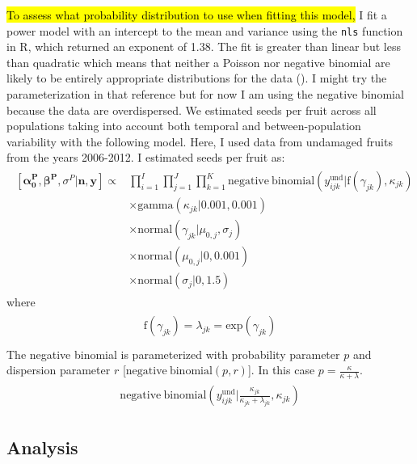 \documentclass[12pt, oneside, titlepage]{article}   	%
\begin{document}
\hl{To assess what probability distribution to use when fitting this model,} I fit a power model with an intercept to the mean and variance using the \verb|nls| function in R, which returned an exponent of 1.38. The fit is greater than linear but less than quadratic which means that neither a Poisson nor negative binomial are likely to be entirely appropriate distributions for the data (\cite{linden2011}). I might try the parameterization in that reference but for now I am using the negative binomial because the data are overdispersed. We estimated seeds per fruit across all populations taking into account both temporal and between-population variability with the following model. Here, I used data from undamaged fruits from the years 2006-2012. I estimated seeds per fruit as:
%
\begin{align}
  \begin{split}
 [ \bm{\alpha^P_0}, \bm{\beta^P}, \sigma^P | \bm{n}, \bm{y} ] \propto 
 & \prod_{i=1}^{I} \prod_{j=1}^{J} \prod_{k=1}^{K}  \mathrm{negative \ binomial} ( y^{\mathrm{und}}_{ijk} | \mathrm{f} ( \gamma_{jk} ),  \kappa_{jk} ) 
     \\ & \times \mathrm{gamma} ( \kappa_{jk} | 0.001 , 0.001 ) 
     \\ & \times \mathrm{normal} ( \gamma_{jk} | \mu_{0,j} , \sigma_j) 
    \\ & \times \mathrm{normal} ( \mu_{0,j} | 0, 0.001 ) 
    \\ & \times \mathrm{normal} ( \sigma_j | 0, 1.5 )  
   \end{split}
\end{align}
%
where
%
\begin{align}
  \begin{split}
\mathrm{f} ( \gamma_{jk} ) = \lambda_{jk} = \mathrm{exp}(  \gamma_{jk} ) \\
  \end{split}
\end{align}
%
The negative binomial is parameterized with probability parameter $p$ and dispersion parameter $r$ [$ \mathrm{negative \ binomial}(p,r)$]. In this case $p=\frac{\kappa}{\kappa+\lambda}$.
%
\begin{align}
  \begin{split}
  \mathrm{negative \ binomial} ( y^{\mathrm{und}}_{ijk} | \frac{\kappa_{jk}}{\kappa_{jk} + \lambda_{jk}} ,  \kappa_{jk} )
  \end{split}
\end{align}

\subsection*{Analysis}
\end{document}
